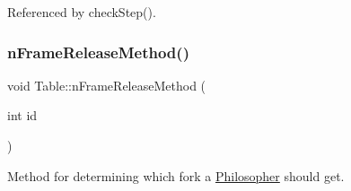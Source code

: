 Referenced by check\+Step().

\mbox{\label{class_table_a1c74d808d5a9c287194467fe766c27ad}} 
\subsubsection{\texorpdfstring{n\+Frame\+Release\+Method()}{nFrameReleaseMethod()}}
{\footnotesize\ttfamily void Table\+::n\+Frame\+Release\+Method (\begin{DoxyParamCaption}\item[{int}]{id }\end{DoxyParamCaption})}



Method for determining which fork a \hyperlink{class_philosopher}{Philosopher} should get. 


